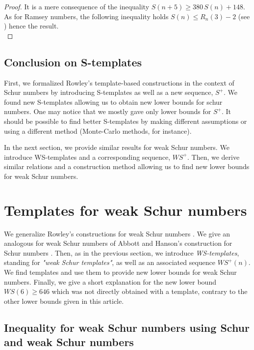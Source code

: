 \documentclass{article}
\newtheorem{computational theorem}[definition]{Computational Theorem}
\newcommand{\WS}{\mathit{WS}}
\begin{document}
\begin{proof}
It is a mere consequence of the inequality \( S(n+5) \geqslant 380 \, S(n) + 148\). As for Ramsey
numbers, the following inequality holds \(S(n) \leqslant R_n(3) - 2\) (see \cite{AbbottHanson}) hence the result. \\
\end{proof}


\subsection{Conclusion on S-templates}

First, we formalized Rowley's template-based constructions \cite{RowleyRamsey} in the context of Schur numbers 
by introducing S-templates as well as a new sequence, \(S^+\). We found new S-templates allowing us to obtain 
new lower bounds for schur numbers. One may notice that we mostly gave only lower bounds for \(S^+\). It should be possible to 
find better S-templates by making different assumptions or using a different method (Monte-Carlo methods, for instance).

\par
In the next section, we provide similar results for weak Schur numbers. We introduce WS-templates and a corresponding sequence, 
\(\WS^+\). Then, we derive similar relations and a construction method allowing us to find new lower bounds for weak Schur numbers.


\section{Templates for weak Schur numbers}
\label{WeakSchur}

We generalize Rowley's constructions for weak Schur numbers \cite{RowleyWS}. We give an analogous for weak Schur numbers of Abbott 
and Hanson's construction for Schur numbers \cite{AbbottHanson}. Then, as in the previous section, we introduce \textit{WS-templates}, 
standing for \textit{"weak Schur templates"}, as well as an associated sequence \(\WS^+(n)\). We find templates and use them to provide 
new lower bounds for weak Schur numbers. Finally, we give a short explanation for the new lower bound \(\WS(6) \geqslant 646\) which 
was not directly obtained with a template, contrary to the other lower bounds given in this article.

\subsection{Inequality for weak Schur numbers using Schur and weak Schur numbers}
\end{document}
